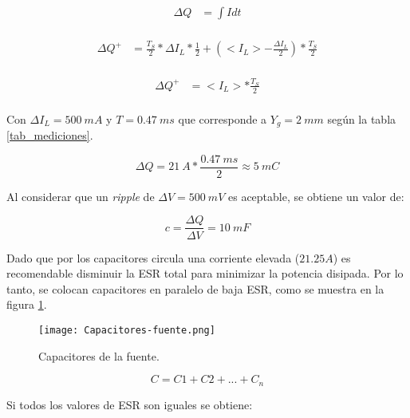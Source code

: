 \begin{equation} 
	\begin{aligned}
		\Delta Q &= \int I dt\\	
	\end{aligned}
\end{equation}

\begin{equation} 
	\begin{aligned}
		\Delta Q ^+ &= \frac{T_S}{2}*\Delta I_L * \frac{1}{2} + (<I_L> -\frac{\Delta I_L}{2})*\frac{T_S}{2}\\
	\end{aligned}
\end{equation}

\begin{equation} 
	\begin{aligned}
		\Delta Q ^+ &= <I_L> *\frac{T_S}{2}\\
	\end{aligned}
\end{equation}

\noindent Con $\Delta I_L=500 \:mA$ y $T=0.47\:ms$ que corresponde a $Y_g = 2 \:mm$ según la tabla \ref{tab_mediciones}.

\begin{equation} 
	\Delta Q = 21\:A * \frac{0.47\:ms}{2} \approx 5\:mC
\end{equation}

\noindent Al considerar que un \textsl{ripple} de $\Delta V=500 \:mV$ es aceptable, se obtiene un valor de:

\begin{equation} 
	c = \frac{\Delta Q}{\Delta V} = 10 \:mF
\end{equation}

\noindent Dado que por los capacitores circula una corriente elevada ($21.25 A$) es recomendable disminuir la ESR total para minimizar la potencia disipada. Por lo tanto, se colocan capacitores en paralelo de baja ESR, como se muestra en la figura \ref{fig:img_capacitores-fuente}.

\begin{figure}[H]
	\centering
	\texttt{[image: Capacitores-fuente.png]}
	\caption{Capacitores de la fuente.}
	\label{fig:img_capacitores-fuente}
\end{figure}


\begin{equation} 
	C = C1 + C2 + ... + C_n
\end{equation}


\noindent Si todos los valores de ESR son iguales se obtiene:

